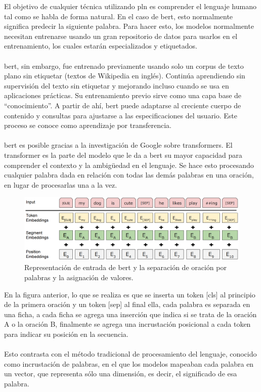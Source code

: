 \documentclass[12pt, a4paper, titlepage]{report}
\begin{document}
		        El objetivo de cualquier técnica utilizando \acrshort{pln} es comprender el lenguaje humano tal como se habla de forma natural. En el caso de \acrshort{bert}, esto normalmente significa predecir la siguiente palabra. Para hacer esto, los modelos normalmente necesitan entrenarse usando un gran repositorio de datos para usarlos en el entrenamiento, los cuales estarán especializados y etiquetados.\\\\     
		        \acrshort{bert}, sin embargo, fue entrenado previamente usando solo un corpus de texto plano sin etiquetar (textos de Wikipedia en inglés). Continúa aprendiendo sin supervisión del texto sin etiquetar y mejorando incluso cuando se usa en aplicaciones prácticas. Su entrenamiento previo sirve como una capa base de “conocimiento”. A partir de ahí, \acrshort{bert} puede adaptarse al creciente cuerpo de contenido y consultas para ajustarse a las especificaciones del usuario. Este proceso se conoce como aprendizaje por transferencia.\\\\        
		        \acrshort{bert} es posible gracias a la investigación de Google sobre transformers. El transformer es la parte del modelo que le da a \acrshort{bert} su mayor capacidad para comprender el contexto y la ambigüedad en el lenguaje. Se hace esto procesando cualquier palabra dada en relación con todas las demás palabras en una oración, en lugar de procesarlas una a la vez.\par        
		        
		        \begin{figure}[H] 
		        	\includegraphics[width=12cm]{./imagenes/MarcoTeorico/Bertprocess.png}
		        	\centering 
		        	\caption{Representación de entrada de \acrshort{bert} y la separación de oración por palabras y la asignación de valores.\cite{refQueesBert}}
		        \end{figure} 
		           
		        En la figura anterior, lo que se realiza es que se inserta un token [\acrfull{cls}] al principio de la primera oración y un token [\acrfull{sep}] al final ella, cada palabra es separada en una ficha, a cada ficha se agrega una inserción que indica si se trata de la oración A o la oración B, finalmente se agrega una incrustación posicional a cada token para indicar su posición en la secuencia. \cite{refComofuncionaBert}\\\\     
		        Esto contrasta con el método tradicional de procesamiento del lenguaje, conocido como incrustación de palabras, en el que los modelos mapeaban cada palabra en un vector, que representa sólo una dimensión, es decir, el significado de esa palabra.\par
		        
\end{document}
